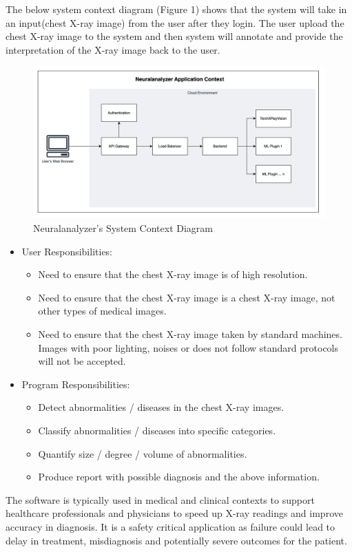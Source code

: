 \documentclass[12pt]{article}
\begin{document}
The below system context diagram (Figure 1) shows that the system will take in an input(chest X-ray image) from the user after they login. The user upload the chest X-ray image to the system and then system will annotate and provide the interpretation of the X-ray image back to the user.



\begin{figure}[h!]
  \centering
  \includegraphics[width=1\textwidth]{SystemContext.png}
  \caption{Neuralanalyzer's System Context Diagram}
  \label{fig:overall-infra}
\end{figure}



\begin{itemize}
\item User Responsibilities:
\begin{itemize}
\item {Need to ensure that the chest X-ray image is of high resolution. }
\item {Need to ensure that the chest X-ray image is a chest X-ray image, not other types of medical images.}
\item {Need to ensure that the chest X-ray image taken by standard machines. Images with poor lighting, noises or does not follow standard protocols will not be accepted. }
\end{itemize}
\item Program Responsibilities:
\begin{itemize}
\item {Detect abnormalities / diseases in the chest X-ray images.}
\item {Classify abnormalities / diseases into specific categories.}
\item {Quantify size / degree / volume of abnormalities.}
\item {Produce report with possible diagnosis and the above information.}
\end{itemize}
\end{itemize}
The software is typically used in medical and clinical contexts to support healthcare professionals and physicians to speed up X-ray readings and improve accuracy in diagnosis. It is a safety critical application as failure could lead to delay in treatment, misdiagnosis and potentially severe outcomes for the patient.
\end{document}
